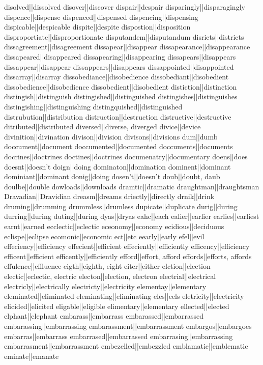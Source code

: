 disolved||dissolved
disover||discover
dispair||despair
disparingly||disparagingly
dispence||dispense
dispenced||dispensed
dispencing||dispensing
dispicable||despicable
dispite||despite
dispostion||disposition
disproportiate||disproportionate
disputandem||disputandum
disricts||districts
dissagreement||disagreement
dissapear||disappear
dissapearance||disappearance
dissapeared||disappeared
dissapearing||disappearing
dissapears||disappears
dissappear||disappear
dissappears||disappears
dissappointed||disappointed
dissarray||disarray
dissobediance||disobedience
dissobediant||disobedient
dissobedience||disobedience
dissobedient||disobedient
distiction||distinction
distingish||distinguish
distingished||distinguished
distingishes||distinguishes
distingishing||distinguishing
distingquished||distinguished
distrubution||distribution
distruction||destruction
distructive||destructive
ditributed||distributed
diversed||diverse, diverged
divice||device
divinition||divination
divison||division
divisons||divisions
dum||dumb
doccument||document
doccumented||documented
doccuments||documents
docrines||doctrines
doctines||doctrines
documenatry||documentary
doens||does
doesnt||doesn't
doign||doing
dominaton||domination
dominent||dominant
dominiant||dominant
donig||doing
dosen't||doesn't
doub||doubt, daub
doulbe||double
dowloads||downloads
dramtic||dramatic
draughtman||draughtsman
Dravadian||Dravidian
dreasm||dreams
driectly||directly
drnik||drink
druming||drumming
drummless||drumless
dupicate||duplicate
durig||during
durring||during
duting||during
dyas||dryas
eahc||each
ealier||earlier
earlies||earliest
earnt||earned
ecclectic||eclectic
eceonomy||economy
ecidious||deciduous
eclispe||eclipse
ecomonic||economic
ect||etc
eearly||early
efel||evil
effeciency||efficiency
effecient||efficient
effeciently||efficiently
efficency||efficiency
efficent||efficient
efficently||efficiently
efford||effort, afford
effords||efforts, affords
effulence||effluence
eigth||eighth, eight
eiter||either
elction||election
electic||eclectic, electric
electon||election, electron
electrial||electrical
electricly||electrically
electricty||electricity
elementay||elementary
eleminated||eliminated
eleminating||eliminating
eles||eels
eletricity||electricity
elicided||elicited
eligable||eligible
elimentary||elementary
ellected||elected
elphant||elephant
embarass||embarrass
embarassed||embarrassed
embarassing||embarrassing
embarassment||embarrassment
embargos||embargoes
embarras||embarrass
embarrased||embarrassed
embarrasing||embarrassing
embarrasment||embarrassment
embezelled||embezzled
emblamatic||emblematic
eminate||emanate
